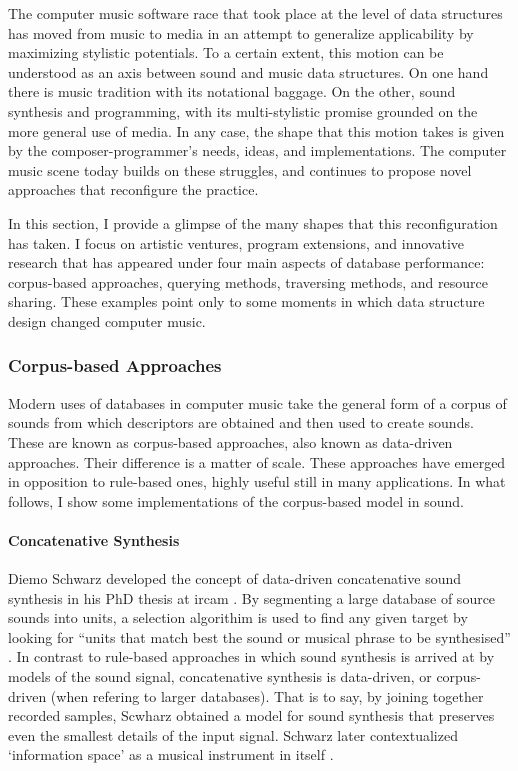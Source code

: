 The computer music software race that took place at the level of data structures has moved from music to media in an attempt to generalize applicability by maximizing stylistic potentials. To a certain extent, this motion can be understood as an axis between sound and music data structures. On one hand there is music tradition with its notational baggage. On the other, sound synthesis and programming, with its multi-stylistic promise grounded on the more general use of media. In any case, the shape that this motion takes is given by the composer-programmer's needs, ideas, and implementations. The computer music scene today builds on these struggles, and continues to propose novel approaches that reconfigure the practice.

In this section, I provide a glimpse of the many shapes that this reconfiguration has taken. I focus on artistic ventures, program extensions, and innovative research that has appeared under four main aspects of database performance: corpus-based approaches, querying methods, traversing methods, and resource sharing. These examples point only to some moments in which data structure design changed computer music.

\subsubsection{Corpus-based Approaches}
	Modern uses of databases in computer music take the general form of a corpus of sounds from which descriptors are obtained and then used to create sounds. These are known as corpus-based approaches, also known as data-driven approaches. Their difference is a matter of scale. These approaches have emerged in opposition to rule-based ones, highly useful still in many applications. In what follows, I show some implementations of the corpus-based model in sound.

	\paragraph{Concatenative Synthesis}
	Diemo Schwarz developed the concept of data-driven concatenative sound synthesis in his PhD thesis at \gls{ircam} \parencites{Schwarz2000}{icmc/bbp2372.2003.099}{Sch06:How}. By segmenting a large database of source sounds into units, a selection algorithim is used to find any given target by looking for ``units that match best the sound or musical phrase to be synthesised'' \parencite{Sch06:How}. In contrast to rule-based approaches in which sound synthesis is arrived at by models of the sound signal, concatenative synthesis is data-driven, or corpus-driven (when refering to larger databases). That is to say, by joining together recorded samples, Scwharz obtained a model for sound synthesis that preserves even the smallest details of the input signal. Schwarz later contextualized `information space' as a musical instrument in itself \parencites{diemo_schwarz_2009_849679}{Schwarz:2012}.

